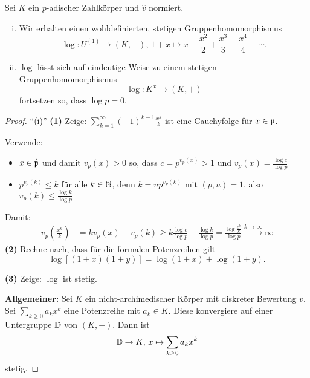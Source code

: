 \begin{Prop}
Sei $K$ ein $p$-adischer Zahlkörper und $\hat{v}$ normiert.
\begin{enumerate}[(i)]
\item Wir erhalten einen wohldefinierten, stetigen Gruppenhomomorphismus
\[ \log \colon U^{(1)} \to (K,+) , \, 1+x \mapsto x - \frac{x^2}{2} + \frac{x^3}{3} - \frac{x^4}{4} + \cdots .
\]
\item $\log$ lässt sich auf eindeutige Weise zu einem stetigen Gruppenhomomorphismus
\[ \log \colon K^x \to (K,+)
\]
fortsetzen so, dass $\log p = 0$.
\end{enumerate}
\end{Prop}


\begin{proof}
\enquote{(i)} \textbf{(1)} Zeige: $\sum_{k=1}^{\infty} (-1)^{k-1} \frac{x^k}{k}$ ist eine Cauchyfolge für $x\in\mathfrak{p}$.

\bigskip Verwende:
\begin{itemize}
\item $x \in \hat{\mathfrak{p}}$ und damit $v_p(x)>0$ so, dass $c= p^{v_p(x)} >1$ und $v_p(x) = \frac{\log c}{\log p}$
\item $p^{v_p(k)} \leq k$ für alle $k \in \mathbb{N}$, denn $k = u p^{v_p(k)}$ mit $(p,u) = 1$, also
	$v_p(k) \leq \frac{\log k}{\log p}$
\end{itemize}
Damit:
\begin{align*}
v_p \left( \frac{x^k}{k} \right)
&= kv_p(x) - v_p(k)
\geq k \frac{\log c}{\log p} - \frac{\log k}{\log p}
= \frac{\log \frac{c^k}{k}}{\log p}
\xrightarrow{k\to \infty} \infty
\end{align*}
\textbf{(2)} Rechne nach, dass für die formalen Potenzreihen gilt
\[ \log [(1+x)(1+y)] = \log (1+x) + \log (1+y).
\]

\bigskip \textbf{(3)} Zeige: $\log$ ist stetig.

\bigskip \textbf{Allgemeiner:} Sei $K$ ein nicht-archimedischer Körper mit diskreter Bewertung $v$. Sei $\sum_{k \geq 0} a_k x^k$ eine Potenzreihe mit $a_k \in K$. Diese konvergiere auf einer Untergruppe $\mathbb{D}$ von $(K,+)$. Dann ist
\[ \mathbb{D} \to K, \, x \mapsto \sum_{k \geq 0} a_k x^k
\]
stetig.


\end{proof}

